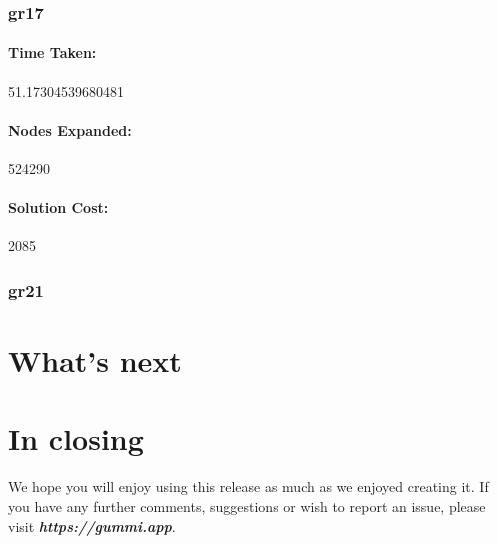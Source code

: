 \documentclass[11pt]{article}
\begin{document}
\subsubsection{gr17}
\paragraph{Time Taken:}51.17304539680481
\paragraph{Nodes Expanded:}524290
\paragraph{Solution Cost:}2085
\subsubsection{gr21}

\section{What's next}


\section{In closing}
We hope you will enjoy using this release as much as we enjoyed creating it. If you have any further comments, suggestions or wish to report an issue, please visit \emph{\textbf{https://gummi.app}}. 
\end{document}
